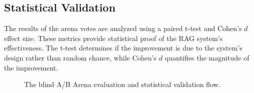 \subsection{Statistical Validation}

The results of the arena votes are analyzed using a paired t-test and Cohen's $d$ effect size. These metrics provide statistical proof of the RAG system's effectiveness. The t-test determines if the improvement is due to the system's design rather than random chance, while Cohen's $d$ quantifies the magnitude of the improvement.

\begin{figure}[H]
    \centering
    \caption{The blind A/B Arena evaluation and statistical validation flow.}
    \label{fig:arena_flow}
\end{figure}
